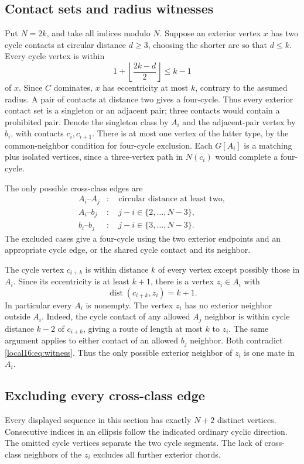 \documentclass[11pt,a4paper]{article}
\theoremstyle{definition}\newtheorem{definition}[theorem]{Definition}
\theoremstyle{remark}\newtheorem{remark}[theorem]{Remark}
\begin{document}
\subsection{Contact sets and radius witnesses}
Put $N=2k$, and take all indices modulo $N$. Suppose an exterior vertex
$x$ has two cycle contacts at circular distance $d\ge3$, choosing the
shorter arc so that $d\le k$. Every cycle vertex is within
\[
 1+\left\lfloor\frac{2k-d}{2}\right\rfloor\le k-1
\]
of $x$. Since $C$ dominates, $x$ has eccentricity at most $k$, contrary
to the assumed radius. A pair of contacts at distance two gives a
four-cycle. Thus every exterior contact set is a singleton or an
adjacent pair; three contacts would contain a prohibited pair.
Denote the singleton class by $A_i$ and the adjacent-pair vertex by
$b_i$, with contacts $c_i,c_{i+1}$. There is at most one vertex of the
latter type, by the common-neighbor condition for four-cycle exclusion.
Each $G[A_i]$ is a matching plus isolated vertices, since a three-vertex
path in $N(c_i)$ would complete a four-cycle.

The only possible cross-class edges are
\begin{align*}
 A_i\text{--}A_j&:\quad \text{circular distance at least two},\\
 A_i\text{--}b_j&:\quad j-i\in\{2,\ldots,N-3\},\\
 b_i\text{--}b_j&:\quad j-i\in\{3,\ldots,N-3\}.
\end{align*}
The excluded cases give a four-cycle using the two exterior endpoints
and an appropriate cycle edge, or the shared cycle contact and its
neighbor.

The cycle vertex $c_{i+k}$ is within distance $k$ of every vertex except
possibly those in $A_i$. Since its eccentricity is at least $k+1$,
there is a vertex $z_i\in A_i$ with
\begin{equation}\label{local16:eq:witness}
 \operatorname{dist}(c_{i+k},z_i)=k+1.
\end{equation}
In particular every $A_i$ is nonempty. The vertex $z_i$ has no exterior
neighbor outside $A_i$. Indeed, the cycle contact of any allowed $A_j$
neighbor is within cycle distance $k-2$ of $c_{i+k}$, giving a route of
length at most $k$ to $z_i$. The same argument applies to either contact
of an allowed $b_j$ neighbor. Both contradict \eqref{local16:eq:witness}.
Thus the only possible exterior neighbor of $z_i$ is one mate in $A_i$.

\subsection{Excluding every cross-class edge}
Every displayed sequence in this section has exactly $N+2$ distinct
vertices. Consecutive indices in an ellipsis follow the indicated
ordinary cyclic direction. The omitted cycle vertices separate the two
cycle segments. The lack of cross-class neighbors of the $z_i$ excludes
all further exterior chords.
\end{document}
